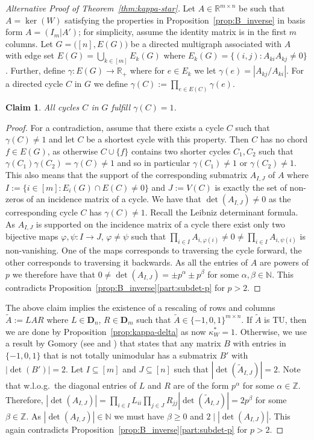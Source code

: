 \documentclass[11pt, a4paper]{article}
\newcommand{\1}{\mathbbm{1}}
\newcommand{\divides}{\mid}
\newcommand{\bD}{\mathbf{D}}
\newtheorem{claim}{Claim}[theorem]
\theoremstyle{case}
\renewcommand{\phi}{\varphi}
\newcommand{\R}{\mathbb{R}}
\newcommand{\Z}{\mathbb{Z}}
\newcommand{\N}{\mathbb{N}}
\begin{document}
\begin{proof}[Alternative Proof of Theorem~\ref{thm:kappa-star}]
  Let $A \in \R^{m \times n}$ be such that $A = \ker(W)$ satisfying the properties in Proposition~\ref{prop:B_inverse} in basis form $A=(I_m|A')$; for simplicity, assume the identity matrix is in the first $m$ columns.
Let $G = \big([n], E(G)\big)$ be a directed multigraph associated with $A$ with edge set $E(G) = \bigcup_{k \in [m]} E_k(G)$ where $E_k(G) = \{(i,j) : A_{ki}A_{kj} \neq 0\}$. Further, define $\gamma\colon E(G) \to \R_+$ where for $e \in E_k$ we let $\gamma(e) = |A_{kj}/A_{ki}|$. For a directed cycle $C$ in $G$ we define $\gamma(C) := \prod_{e \in E(C)} \gamma(e)$.
\begin{claim}
All cycles $C$ in $G$ fulfill $\gamma(C) = 1$.
\end{claim}
\begin{proof}
For a contradiction, assume that there exists a cycle $C$ such that $\gamma(C) \neq 1$ and let $C$ be a shortest cycle with this property. Then $C$ has no chord $f \in E(G)$, as otherwise $C \cup \{f\}$ contains two shorter cycles $C_1, C_2$ such that $\gamma(C_1) \gamma(C_2) = \gamma(C) \neq 1$ and so in particular $\gamma(C_1) \neq 1$ or $\gamma(C_2) \neq 1$. This also means that the support of the corresponding submatrix $A_{I,J}$ of $A$ where $I := \{i \in [m] : E_i(G) \cap E(C) \neq 0\}$ and $J := V(C)$ is exactly the set of non-zeros of an incidence matrix of a cycle. We have that $\det(A_{I,J}) \neq 0$ as the corresponding cycle $C$ has $\gamma(C) \neq 1$. 
Recall the Leibniz determinant formula. As $A_{I,J}$ is supported on the incidence matrix of a cycle there exist only two bijective maps $\phi, \psi: I \to J$, $\phi \neq \psi$ such that $\prod_{i\in I}A_{i,\phi(i)} \neq 0 \neq \prod_{i \in I} A_{i, \psi(i)}$ is non-vanishing. One of the maps corresponds to traversing the cycle forward, the other corresponds to traversing it backwards. As all the entries of $A$ are powers of $p$ we therefore have that $0 \neq \det(A_{I,J}) = \pm p^\alpha \pm p^\beta $ for some $\alpha, \beta \in \N$. This contradicts Proposition~\ref{prop:B_inverse}\ref{part:subdet-p} for $p > 2$.
\end{proof}

The above claim implies the existence of a rescaling of rows and columns $\tilde A:= LAR$ where $L\in \bD_n$, $R \in \bD_m$ such that $\tilde A \in \{-1,0,1\}^{m \times n}$. If $\tilde A$ is TU, then we are done by Proposition~\ref{prop:kappa-delta} as now $\kappa_W^* =1$. Otherwise, we use a result by Gomory (see \cite{Camion1965} and \cite[Theorem 19.3]{SchrijverLPIP}) that states that any matrix $B$ with entries in $\{-1,0,1\}$ that is not totally unimodular has a submatrix $B'$ with $|\det(B')| = 2$. 
Let $I \subseteq [m]$ and $J \subseteq [n]$ such that $|\det(\tilde A_{I,J})| = 2$. Note that w.l.o.g.\ the diagonal entries of $L$ and $R$ are of the form $p^\alpha$ for some $\alpha \in \Z$. Therefore, $|\det(A_{I,J})| = \prod_{i \in I}L_{ii} \prod_{j \in J} R_{jj} |\det (\tilde A_{I,J})| = 2p^\beta$ for some $\beta \in \Z$. As $|\det(A_{I,J})| \in \N$ we must have $\beta \ge 0$ and  $2 \divides |\det(A_{I,J})|$. This again contradicts Proposition~\ref{prop:B_inverse}\ref{part:subdet-p} for $p > 2$.
\end{proof} 
\end{document}
